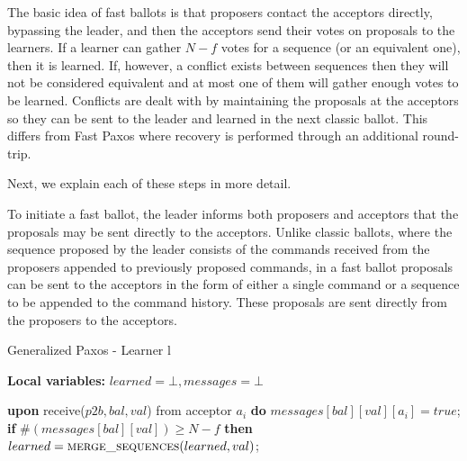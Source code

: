 The basic idea of fast ballots is that proposers contact the acceptors directly, bypassing the leader, and then the acceptors send their votes on proposals to the learners. If a learner can gather $N-f$ votes for a sequence (or an equivalent one), then it is learned. If, however, a conflict exists between sequences then they will not be considered equivalent and at most one of them will gather enough votes to be learned. Conflicts are dealt with by maintaining the proposals at the acceptors so they can be sent to the leader and learned in the next classic ballot. This differs from Fast Paxos where recovery is performed through an additional round-trip. \par
Next, we explain each of these steps in more detail.\par
{}
To initiate a fast ballot, the leader informs both proposers and acceptors that the proposals may be sent directly to the acceptors. Unlike classic ballots, where the sequence proposed by the leader consists of the commands received from the proposers appended to previously proposed commands, in a fast ballot proposals can be sent to the acceptors in the form of either a single command or a sequence to be appended to the command history. These proposals are sent directly from the proposers to the acceptors.\par

\begin{algorithm}
	\caption{Generalized Paxos - Learner l}
	\textbf{Local variables: } $learned = \bot, messages = \bot$ 
	\begin{algorithmic}[1]
		\State \textbf{upon} receive($p2b, bal, val$) from acceptor $a_i$ \textbf{do}
		\State \hspace{\algorithmicindent} $messages[bal][val][a_i] = true$;
		\State \hspace{\algorithmicindent} \textbf{if} $\#(messages[bal][val]) \geq N-f$ \textbf{then}
		\State \hspace{\algorithmicindent} \hspace{\algorithmicindent} \hspace{\algorithmicindent} $learned = \Call{merge\_sequences}{learned, val}$;
	\end{algorithmic}
\end{algorithm}

